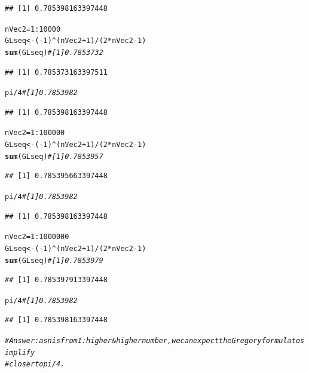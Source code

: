 \documentclass{article}\usepackage[]{graphicx}\usepackage[]{xcolor}
\makeatletter
\newcommand{\hlnum}[1]{\textcolor[rgb]{0.686,0.059,0.569}{#1}}%
\newcommand{\hlcom}[1]{\textcolor[rgb]{0.678,0.584,0.686}{\textit{#1}}}%
\newcommand{\hlopt}[1]{\textcolor[rgb]{0,0,0}{#1}}%
\newcommand{\hlstd}[1]{\textcolor[rgb]{0.345,0.345,0.345}{#1}}%
\newcommand{\hlkwb}[1]{\textcolor[rgb]{0.69,0.353,0.396}{#1}}%
\newcommand{\hlkwd}[1]{\textcolor[rgb]{0.737,0.353,0.396}{\textbf{#1}}}%
\newenvironment{kframe}{%
 \def\at@end@of@kframe{}%
 \ifinner\ifhmode%
  \def\at@end@of@kframe{\end{minipage}}%
  \begin{minipage}{\columnwidth}%
 \fi\fi%
 \def\FrameCommand##1{\hskip\@totalleftmargin \hskip-\fboxsep
 \colorbox{shadecolor}{##1}\hskip-\fboxsep
     \hskip-\linewidth \hskip-\@totalleftmargin \hskip\columnwidth}%
 \MakeFramed {\advance\hsize-\width
   \@totalleftmargin\z@ \linewidth\hsize
   \@setminipage}}%
 {\par\unskip\endMakeFramed%
 \at@end@of@kframe}
\newenvironment{knitrout}{}{} %
\makeatother
\begin{document}
\begin{knitrout}
\begin{kframe}
\begin{alltt}
\end{alltt}
\begin{verbatim}
## [1] 0.785398163397448
\end{verbatim}
\begin{alltt}
\hlstd{nVec2} \hlkwb{=} \hlnum{1}\hlopt{:}\hlnum{10000}
\hlstd{GLseq} \hlkwb{<-} \hlstd{(}\hlopt{-}\hlnum{1}\hlstd{)}\hlopt{^}\hlstd{(nVec2}\hlopt{+}\hlnum{1}\hlstd{)}\hlopt{/}\hlstd{(}\hlnum{2}\hlopt{*}\hlstd{nVec2}\hlopt{-}\hlnum{1}\hlstd{)}
\hlkwd{sum}\hlstd{(GLseq)} \hlcom{#[1] 0.7853732}
\end{alltt}
\begin{verbatim}
## [1] 0.785373163397511
\end{verbatim}
\begin{alltt}
\hlstd{pi}\hlopt{/}\hlnum{4} \hlcom{#[1] 0.7853982}
\end{alltt}
\begin{verbatim}
## [1] 0.785398163397448
\end{verbatim}
\begin{alltt}
\hlstd{nVec2} \hlkwb{=} \hlnum{1}\hlopt{:}\hlnum{100000}
\hlstd{GLseq} \hlkwb{<-} \hlstd{(}\hlopt{-}\hlnum{1}\hlstd{)}\hlopt{^}\hlstd{(nVec2}\hlopt{+}\hlnum{1}\hlstd{)}\hlopt{/}\hlstd{(}\hlnum{2}\hlopt{*}\hlstd{nVec2}\hlopt{-}\hlnum{1}\hlstd{)}
\hlkwd{sum}\hlstd{(GLseq)} \hlcom{#[1] 0.7853957}
\end{alltt}
\begin{verbatim}
## [1] 0.785395663397448
\end{verbatim}
\begin{alltt}
\hlstd{pi}\hlopt{/}\hlnum{4} \hlcom{#[1] 0.7853982}
\end{alltt}
\begin{verbatim}
## [1] 0.785398163397448
\end{verbatim}
\begin{alltt}
\hlstd{nVec2} \hlkwb{=} \hlnum{1}\hlopt{:}\hlnum{1000000}
\hlstd{GLseq} \hlkwb{<-} \hlstd{(}\hlopt{-}\hlnum{1}\hlstd{)}\hlopt{^}\hlstd{(nVec2}\hlopt{+}\hlnum{1}\hlstd{)}\hlopt{/}\hlstd{(}\hlnum{2}\hlopt{*}\hlstd{nVec2}\hlopt{-}\hlnum{1}\hlstd{)}
\hlkwd{sum}\hlstd{(GLseq)} \hlcom{#[1] 0.7853979}
\end{alltt}
\begin{verbatim}
## [1] 0.785397913397448
\end{verbatim}
\begin{alltt}
\hlstd{pi}\hlopt{/}\hlnum{4} \hlcom{#[1] 0.7853982}
\end{alltt}
\begin{verbatim}
## [1] 0.785398163397448
\end{verbatim}
\begin{alltt}
\hlcom{#Answer: as n is from 1:higher & higher number, we can expect the Gregory formula to simplify}
\hlcom{#closer to pi/4.}


\end{alltt}
\end{kframe}
\end{knitrout}
\end{document}
